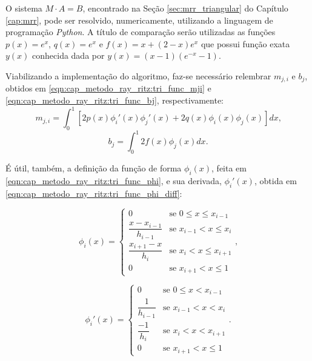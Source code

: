 \documentclass[
	12pt,				%
	openright,			%
    twoside,			%
	a4paper,			%
	chapter=TITLE,		%
	english,			%
	french,				%
	spanish,			%
	brazil				%
	]{abntex2}
\numberwithin{lema}{chapter}
\numberwithin{teorema}{chapter}
\numberwithin{definicao}{chapter}
\numberwithin{exemplo}{chapter}
\numberwithin{figure}{chapter}
\begin{document}
O sistema $M\cdot A=B$, encontrado na Seção \ref{sec:mrr_triangular} do Capítulo \ref{cap:mrr}, pode ser resolvido, numericamente, utilizando a linguagem de programação \textit{Python}. A título de comparação serão utilizadas as funções $p(x)=e^x$, $q(x)=e^x$ e $f(x)=x+(2-x)e^x$ que possui função exata $y(x)$ conhecida dada por $y(x)=(x-1)(e^{-x}-1)$.

Viabilizando a implementação do algoritmo, faz-se necessário relembrar $m_{j,i}$ e $b_j$, obtidos em \eqref{eqn:cap_metodo_ray_ritz:tri_func_mji} e \eqref{eqn:cap_metodo_ray_ritz:tri_func_bj}, respectivamente:
\begin{equation}
	\label{eqn:python_tri_func_mji}
	m_{j,i}=\int_{0}^{1} \left [
		2p(x)\phi_i'(x)\phi_j'(x)
		+
		2q(x)\phi_i(x)\phi_j(x)
	\right ]dx
	\text{,}
\end{equation}
\begin{equation}
	\label{eqn:python_tri_func_bj}
	b_j=\int_{0}^{1} 2f(x)\phi_j(x)dx
	\text{.}
\end{equation}

É útil, também, a definição da função de forma $\phi_i(x)$, feita em \eqref{eqn:cap_metodo_ray_ritz:tri_func_phi}, e sua derivada, $\phi_i'(x)$, obtida em \eqref{eqn:cap_metodo_ray_ritz:tri_func_phi_diff}:

\begin{equation}
	\label{eqn:python_tri_func_phi}
	\phi_i (x) = 
		\begin{cases}
			0 							& \mbox{se } 0 \leqslant x \leqslant x_{i - 1}\\
			\dfrac{x-x_{i-1}}{h_{i-1}} 	& \mbox{se } x_{i-1} < x \leqslant x_i\\
			\dfrac{x_{i+1}-x}{h_i}		& \mbox{se } x_i < x \leqslant x_{i+1}\\
			0							& \mbox{se } x_{i+1}<x\leqslant 1
		\end{cases}
	\text{,}
\end{equation}

\begin{equation}
	\label{eqn:python_tri_func_phi_diff}
	\phi_i ' (x) = 
		\begin{cases}
			0 							& \mbox{se } 0 \leqslant x < x_{i - 1}\\
			\dfrac{1}{h_{i-1}} 			& \mbox{se } x_{i-1} < x < x_i\\
			\dfrac{-1}{h_i}				& \mbox{se } x_i < x < x_{i+1}\\
			0							& \mbox{se } x_{i+1}<x\leqslant 1
		\end{cases}
	\text{.}
\end{equation}
\end{document}
